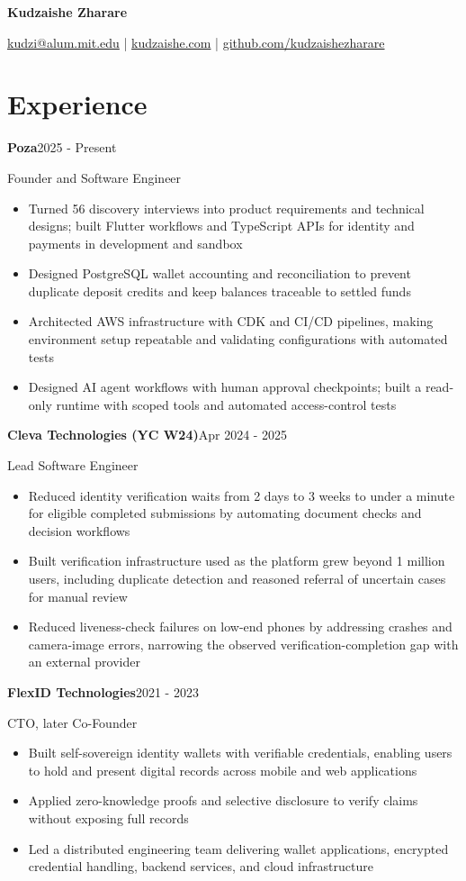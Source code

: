 \documentclass[11pt,a4paper]{article}
\newcommand{\role}[3]{\textbf{#1}\hfill #3\par #2\par}
\begin{document}
\raggedright
\begin{center}
{\fontsize{22}{25}\selectfont\textbf{Kudzaishe Zharare}}\par
\vspace{4pt}
\href{mailto:kudzi@alum.mit.edu}{kudzi@alum.mit.edu} \enspace | \enspace
\href{https://www.kudzaishe.com}{kudzaishe.com} \enspace | \enspace
\href{https://github.com/kudzaishezharare}{github.com/kudzaishezharare}
\end{center}

\section{Experience}
\role{Poza}{Founder and Software Engineer}{2025 - Present}
\begin{itemize}
  \item Turned 56 discovery interviews into product requirements and technical designs; built Flutter workflows and TypeScript APIs for identity and payments in development and sandbox
  \item Designed PostgreSQL wallet accounting and reconciliation to prevent duplicate deposit credits and keep balances traceable to settled funds
  \item Architected AWS infrastructure with CDK and CI/CD pipelines, making environment setup repeatable and validating configurations with automated tests
  \item Designed AI agent workflows with human approval checkpoints; built a read-only runtime with scoped tools and automated access-control tests
\end{itemize}

\role{Cleva Technologies (YC W24)}{Lead Software Engineer}{Apr 2024 - 2025}
\begin{itemize}
  \item Reduced identity verification waits from 2 days to 3 weeks to under a minute for eligible completed submissions by automating document checks and decision workflows
  \item Built verification infrastructure used as the platform grew beyond 1 million users, including duplicate detection and reasoned referral of uncertain cases for manual review
  \item Reduced liveness-check failures on low-end phones by addressing crashes and camera-image errors, narrowing the observed verification-completion gap with an external provider
\end{itemize}

\role{FlexID Technologies}{CTO, later Co-Founder}{2021 - 2023}
\begin{itemize}
  \item Built self-sovereign identity wallets with verifiable credentials, enabling users to hold and present digital records across mobile and web applications
  \item Applied zero-knowledge proofs and selective disclosure to verify claims without exposing full records
  \item Led a distributed engineering team delivering wallet applications, encrypted credential handling, backend services, and cloud infrastructure
\end{itemize}
\end{document}
